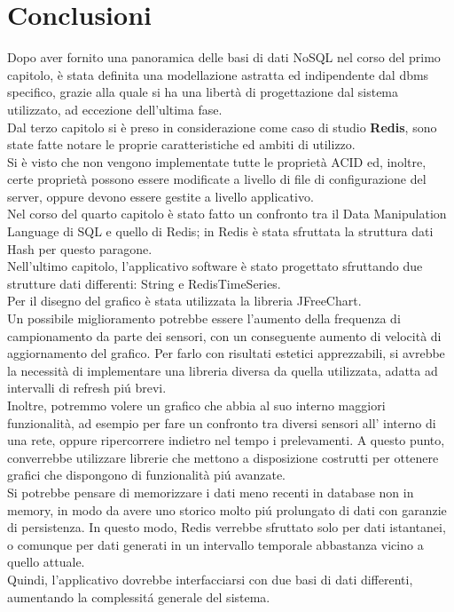 \chapter{Conclusioni}
Dopo aver fornito una panoramica delle basi di dati NoSQL nel corso del primo capitolo,
è stata definita una modellazione astratta ed indipendente dal dbms specifico, grazie alla quale si ha una libertà
di progettazione dal sistema utilizzato, ad eccezione dell'ultima fase.\\
Dal terzo capitolo si è preso in considerazione come caso di studio \textbf{Redis}, sono state fatte notare le proprie caratteristiche
ed ambiti di utilizzo.\\
Si è visto che non vengono implementate tutte le proprietà ACID ed, inoltre, certe proprietà
possono essere modificate a livello di file di configurazione del server, oppure devono essere gestite a livello applicativo.\\
Nel corso del quarto capitolo è stato fatto un confronto tra il Data Manipulation Language di SQL
e quello di Redis;
in Redis è stata sfruttata la struttura dati Hash per questo paragone.\\
Nell'ultimo capitolo, l'applicativo software è stato progettato sfruttando due strutture dati differenti: String e RedisTimeSeries.\\
Per il disegno del grafico è stata utilizzata la libreria JFreeChart.\\
Un possibile miglioramento potrebbe essere l'aumento della frequenza di campionamento da parte dei sensori, con un conseguente aumento di velocità di aggiornamento del grafico.
Per farlo con risultati estetici apprezzabili, si avrebbe la necessità
di implementare una libreria diversa da quella utilizzata, adatta ad intervalli di refresh piú brevi.\\
Inoltre, potremmo volere un grafico che abbia al suo interno maggiori funzionalità, ad esempio per fare un confronto tra diversi sensori all' interno di una rete, oppure
ripercorrere indietro nel tempo i prelevamenti.
A questo punto, converrebbe utilizzare librerie che mettono a disposizione costrutti per ottenere grafici che dispongono di funzionalità piú avanzate.\\
Si potrebbe pensare di memorizzare i dati meno recenti in database non in memory, in modo da avere uno storico molto piú prolungato di dati con garanzie di persistenza.
In questo modo, Redis verrebbe sfruttato solo per dati istantanei, o comunque per dati generati in un intervallo temporale abbastanza vicino a quello attuale.\\
Quindi, l'applicativo dovrebbe interfacciarsi con due basi di dati differenti, aumentando la complessitá generale del sistema.
